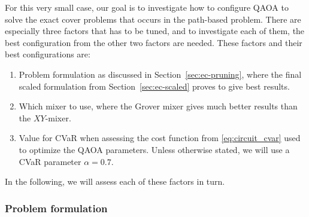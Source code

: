 \documentclass{article}
\begin{document}
For this very small case, our goal is to investigate how to configure QAOA to solve the exact cover problems that occurs in the path-based problem. There are especially three factors that has to be tuned, and to investigate each of them, the best configuration from the other two factors are needed.
These factors and their best configurations are:
\begin{enumerate}
    \item Problem formulation as discussed in Section~\ref{sec:ec-pruning}, where the final scaled formulation from Section~\ref{sec:ec-scaled} proves to give best results.
    \item Which mixer to use, where the Grover mixer gives much better results than the $XY$-mixer.
    \item Value for CVaR when assessing the cost function from \eqref{eq:circuit_cvar} used to optimize the QAOA parameters. Unless otherwise stated, we will use a CVaR parameter $\alpha = 0.7$.
\end{enumerate}
In the following, we will assess each of these factors in turn.

\subsubsection{Problem formulation}
\end{document}

